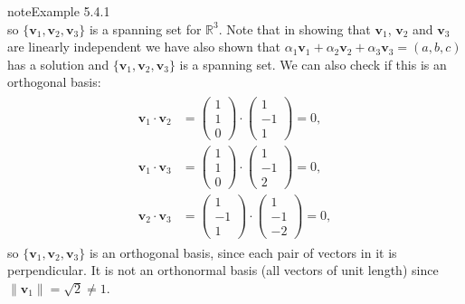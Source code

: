 \documentclass[letterpaper,10pt,english]{jupyterBook}
\begin{document}
\begin{sphinxadmonition}{note}{Example 5.4.1}
\begin{equation*}
\end{equation*}
\sphinxAtStartPar
so \(\{ \mathbf{v}_1, \mathbf{v}_2, \mathbf{v}_3 \}\) is a spanning set for \(\mathbb{R}^3\). Note that in showing that \(\mathbf{v}_1\), \(\mathbf{v}_2\) and \(\mathbf{v}_3\) are linearly independent we have also shown that \(\alpha_1 \mathbf{v}_1 + \alpha_2 \mathbf{v}_2 + \alpha_3 \mathbf{v}_3 = (a, b, c)\) has a solution and \(\{ \mathbf{v}_1, \mathbf{v}_2, \mathbf{v}_3 \}\) is a spanning set. We can also check if this is an orthogonal basis:
\begin{equation*}
\begin{split} \begin{align*}
    \mathbf{v}_1 \cdot \mathbf{v}_2 &= \begin{pmatrix} 1 \\ 1 \\ 0 \end{pmatrix} \cdot
    \begin{pmatrix} 1 \\ -1 \\ 1 \end{pmatrix} = 0, \\
    \mathbf{v}_1 \cdot \mathbf{v}_3 &= \begin{pmatrix} 1 \\ 1 \\ 0 \end{pmatrix} \cdot
    \begin{pmatrix} 1 \\ -1 \\ 2 \end{pmatrix} = 0, \\
    \mathbf{v}_2 \cdot \mathbf{v}_3 &= \begin{pmatrix} 1 \\ -1 \\ 1 \end{pmatrix} \cdot
    \begin{pmatrix} 1 \\ -1 \\ -2 \end{pmatrix} = 0,
\end{align*} \end{split}
\end{equation*}
\sphinxAtStartPar
so \(\{ \mathbf{v}_1, \mathbf{v}_2, \mathbf{v}_3 \}\) is an orthogonal basis, since each pair of vectors in it is perpendicular. It is not an orthonormal basis (all vectors of unit length) since \(\|\mathbf{v}_1\| = \sqrt{2} \neq 1\).
\end{sphinxadmonition}
\end{document}

